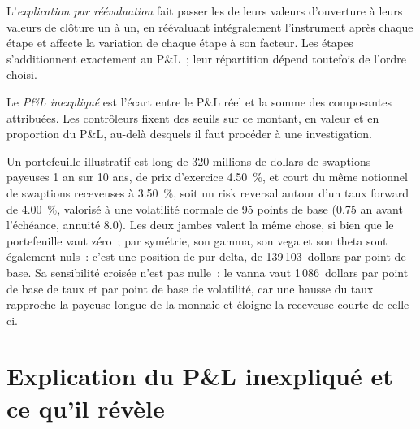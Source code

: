 \begin{definition}\label{def:rc:pnl-explain-and-independent-price-verification:reval}
L'\emph{explication par réévaluation} fait passer les 
de leurs valeurs d'ouverture à leurs valeurs de clôture un à un, en réévaluant intégralement l'instrument
après chaque étape et affecte la variation de chaque étape à son facteur. Les étapes s'additionnent exactement au P\&L~;
leur répartition dépend toutefois de l'ordre choisi.
\end{definition}

\begin{definition}[P\&L inexpliqué]\label{def:rc:pnl-explain-and-independent-price-verification:unexplained}
Le \emph{P\&L inexpliqué} est l'écart entre le P\&L réel et la somme des
composantes attribuées. Les contrôleurs fixent des seuils sur ce montant, en valeur et en proportion du
P\&L, au-delà desquels il faut procéder à une investigation.
\end{definition}

\begin{example}\label{ex:rc:pnl-explain-and-independent-price-verification:book}
Un portefeuille illustratif est long de 320 millions de dollars de swaptions payeuses 1 an sur 10 ans, de prix d'exercice 4.50~\%,
et court du même notionnel de swaptions receveuses à 3.50~\%, soit un risk reversal autour d'un taux forward de 4.00~\%, valorisé à
une volatilité normale de 95 points de base (0.75 an avant l'échéance, annuité 8.0). Les deux jambes valent la
même chose, si bien que le portefeuille vaut zéro~; par symétrie, son gamma, son vega et son theta sont également nuls~: c'est une
position de pur delta, de 139\,103~dollars par point de base. Sa sensibilité croisée n'est pas nulle~: le vanna
vaut 1\,086~dollars par point de base de taux et par point de base de volatilité, car une hausse du taux rapproche la payeuse longue
de la monnaie et éloigne la receveuse courte de celle-ci.
\end{example}

\label{lst:rc:pnl-explain-and-independent-price-verification:risk}

\section{Explication du P\&L inexpliqué et ce qu'il révèle}

